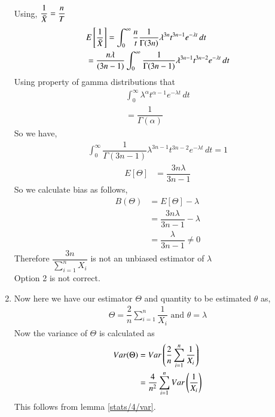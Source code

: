 \begin{enumerate}
\begin{align}
    \end{align}
    Using, $ \dfrac{1}{\Bar{X}} = \dfrac{n}{T}$
    \begin{align}
       & E \left[   \dfrac{1}{\Bar{X}}  \right] =  \int_{0}^{\infty} \dfrac{n}{t} \dfrac{1}{\Gamma(3n)} \lambda^{3n}t^{3n-1}e^{-\lambda t}\,dt \\
        &= \dfrac{n\lambda}{(3n-1)} \int_{0}^{\infty}  \dfrac{1}{\Gamma(3n-1)} \lambda^{3n-1}t^{3n-2}e^{-\lambda t}\,dt 
    \end{align}
    Using property of gamma distributions that
    \begin{align}
        \int_{0}^{\infty}  \lambda^{\alpha}t^{\alpha-1}e^{-\lambda t}\,dt \\ 
        = \dfrac{1}{\Gamma(\alpha)}
    \end{align}
    So we have,
    \begin{align}
        \int_{0}^{\infty}  \dfrac{1}{\Gamma(3n-1)} \lambda^{3n-1}t^{3n-2}e^{-\lambda t}\,dt = 1
    \end{align}
    \begin{align}
        E \left[   \Theta  \right] &= \dfrac{3n\lambda}{3n-1}
    \end{align}
    So we calculate bias as follows,
    \begin{align}
        B(\Theta) & = E[\Theta] - \lambda \\
        &= \dfrac{3n\lambda}{3n-1} - \lambda \\
        &= \dfrac{\lambda}{3n-1} \neq 0
    \end{align}
    Therefore $ \dfrac{3n}{\sum_{i=1}^{n} X_i } $ is not an unbiased estimator of $ \lambda$ \\
    Option 2 is not correct. \\
    \item
     Now here we have our estimator $ \Theta$ and quantity to be estimated $ \theta $ as,
     \begin{align}
         \Theta = \dfrac{2}{n} \sum_{i=1}^{n} \dfrac{1}{X_i} \text{  and  }
         \theta = \lambda
     \end{align}
    Now the variance of $ \Theta$ is calculated as
    \begin{align}
        Var(\Theta) &= Var\left(\dfrac{2}{n} \sum_{i=1}^{n} \dfrac{1}{X_i} \right) \\
        & = \dfrac{4}{n^2} \sum_{i=1}^{n} Var\left(\dfrac{1}{X_i}\right) 
        \label{stats/4/eq3}
    \end{align}
    This follows from lemma \ref{stats/4/var}.

\end{enumerate}

